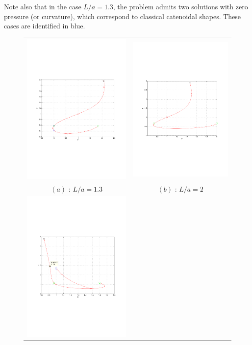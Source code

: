 \documentclass{jfm}
\begin{document}
Note also that in the case $L/a = 1.3$, the problem admits two solutions with zero pressure (or curvature), which correspond to classical catenoidal shapes. These cases are identified in blue.
 




\begin{figure}
\begin{tabular}{cc}
\includegraphics[width=.45\linewidth]{PV_Bridge_L1_3.pdf} &
\includegraphics[width=.45\linewidth]{PV_Bridge_L2.pdf} \\
$(a)$ : $L/a = 1.3$ & $(b)$ : $L/a = 2$ \\
\includegraphics[width=.45\linewidth]{PV_Bridge_L4.pdf} & 

\end{tabular}
\end{figure}
\end{document}
